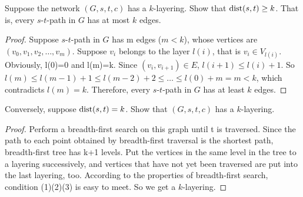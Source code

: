 
\begin{exercise}
   Suppose the network $(G,s,t,c)$ has a $k$-layering. Show that ${\rm dist}(s,t) \geq k$.
   That is, every $s$-$t$-path in $G$ has at most $k$ edges.
\end{exercise}

\begin{proof}
Suppose $s$-$t$-path in $G$ has m edges ($m < k$), whose vertices are $(v_0,v_1,v_2,\ldots,v_m)$. Suppose $v_i$ belongs to the layer $l(i)$, that is $v_i \in V_{l(i)}$. Obviously, l(0)=0 and l(m)=k. Since $(v_i,v_{i+1}) \in E$, $l(i+1) \le l(i)+1$. So $l(m) \le l(m-1) +1 \le l(m-2) +2 \le \ldots \le l(0) + m =m <k $, which contradicts $l(m)=k$. Therefore, every $s$-$t$-path in $G$ has at least $k$ edges.
\end{proof}

\begin{exercise}
   Conversely, suppose ${\rm dist}(s,t) = k$. Show that $(G,s,t,c)$ has a $k$-layering.
\end{exercise}


\begin{proof}
Perform a breadth-first search on this graph until t is traversed. Since the path to each point obtained by breadth-first traversal is the shortest path, breadth-first tree has k+1 levels. Put the vertices in the same level in the tree to a layering successively, and vertices that have not yet been traversed are put into the last layering, too. According to the properties of breadth-first search,  condition (1)(2)(3) is easy to meet. So we get a $k$-layering.
\end{proof}
